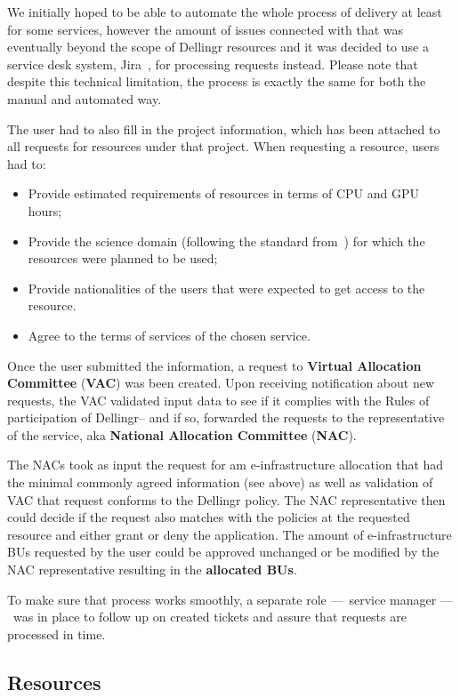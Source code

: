 \documentclass{article}
\newcommand{\dell}{Dellingr\xspace}
\newcommand{\einfra}{e-infrastructure\xspace}
\begin{document}
We initially hoped to be able to automate the whole process of delivery at least for some services, however the amount of issues connected with that was eventually beyond the scope of \dell resources and it was decided to use a service desk system, Jira~\cite{jira}, for processing requests instead. 
Please note that despite this technical limitation, the process is exactly the same for both the manual and automated way.

The user had to also fill in the project information, which has been attached to all requests for resources under that project.
When requesting a resource, users had to:
\begin{itemize}
    \item Provide estimated requirements of resources in terms of CPU and GPU hours;
    \item Provide the science domain (following the standard from~\cite{science-domains}) for which the resources were planned to be used;
    \item Provide nationalities of the users that were expected to get access to the resource.
    \item Agree to the terms of services of the chosen service.
\end{itemize}

Once the user submitted the information, a request to \textbf{Virtual Allocation Committee} (\textbf{VAC}) was been created. 
Upon receiving notification about new requests, the VAC validated input data to see if it complies with the Rules of participation of \dell -- and if so, forwarded the requests to the representative of the service, aka \textbf{National Allocation Committee} (\textbf{NAC}).

The NACs took as input the request for am \einfra allocation that had the minimal commonly agreed information (see above) as well as validation of VAC that request conforms to the \dell policy. 
The NAC representative then could decide if the request also matches with
the policies at the requested resource and either grant or deny the application.
The amount of \einfra BUs requested by the user could be approved unchanged or be modified by the NAC representative resulting in the {\bf allocated BUs}.

To make sure that process works smoothly, a separate role –– service manager –– was in place to follow up on created tickets and assure that requests are processed in time.

\subsection{Resources}
\end{document}
